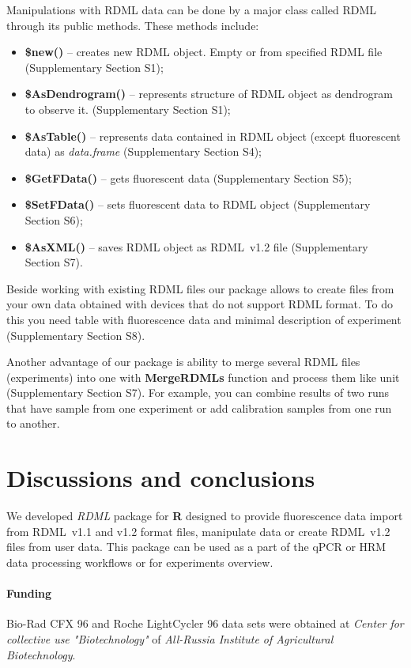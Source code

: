 \documentclass{bioinfo}
\begin{document}
Manipulations with RDML data can be done by a major class called RDML through its public methods. 
These methods include:
\begin{itemize}
	\item \textbf{\$new()} -- creates new RDML object. Empty or from specified RDML file (Supplementary Section S1);
	\item \textbf{\$AsDendrogram()} -- represents structure of RDML object as dendrogram to observe it. (Supplementary Section S1);
	\item \textbf{\$AsTable()} -- represents data contained in RDML object (except fluorescent data) as \textit{data.frame} (Supplementary Section S4);
	\item \textbf{\$GetFData()} -- gets fluorescent data (Supplementary Section S5);
	\item \textbf{\$SetFData()} -- sets fluorescent data to RDML object (Supplementary Section S6);
	\item \textbf{\$AsXML()} -- saves RDML object as RDML~v1.2 file (Supplementary Section S7).
\end{itemize}

Beside working with existing RDML files our package allows to create files from your own data obtained with devices that do not support RDML format. To do this you need table with fluorescence data and minimal description of experiment (Supplementary Section S8).

Another advantage of our package is ability to merge several RDML files (experiments) into one with \textbf{MergeRDMLs} function and process them like unit (Supplementary Section S7). For example, you can combine results of two runs that have sample from one experiment or add calibration samples from one run to another.

\section{Discussions and conclusions}

We developed \textit{RDML} package for \textbf{R} designed to provide fluorescence data import from RDML~v1.1 and v1.2 format files, manipulate data or create RDML~v1.2 files from user data. This package can be used as a part of the qPCR or HRM data processing workflows or for experiments overview.

\paragraph{Funding\textcolon}  Bio-Rad CFX 96 and Roche LightCycler 96 data sets were obtained at \textit{Center for collective use "Biotechnology"} of \textit{All-Russia Institute of Agricultural Biotechnology}.

%
%
%
%
%
%

%

\end{document}
